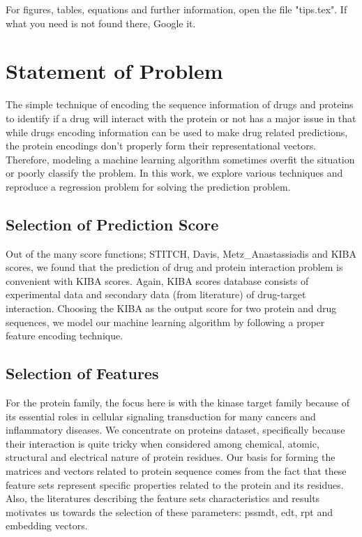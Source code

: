 For figures, tables, equations and further information, open the file "tips.tex". If what you need is not found there, Google it.

\fi

\section{Statement of Problem}
The simple technique of encoding the sequence information of drugs and proteins to identify if a drug will interact with the protein or not has a major issue in that while drugs encoding information can be used to make drug related predictions, the protein encodings don't properly form their representational vectors. Therefore, modeling a machine learning algorithm sometimes overfit the situation or poorly classify the problem. In this work, we explore various techniques and reproduce a regression problem for solving the prediction problem.

\subsection{Selection of Prediction Score}

Out of the many score functions; STITCH, Davis, Metz\_Anastassiadis and KIBA scores, we found that the prediction of drug and protein interaction problem is convenient with KIBA scores. Again, KIBA scores database consists of experimental data and secondary data (from literature) of drug-target interaction. Choosing the KIBA as the output score for two protein and drug sequences, we model our machine learning algorithm by following a proper feature encoding technique.

\subsection{Selection of Features}

For the protein family, the focus here is with the kinase target family because of its essential roles in cellular signaling transduction for many cancers and inflammatory diseases. We concentrate on proteins dataset, specifically because their interaction is quite tricky when considered among chemical, atomic, structural and electrical nature of protein residues. Our basis for forming the matrices and vectors related to protein sequence comes from the fact that these feature sets represent specific properties related to the protein and its residues. Also, the literatures describing the feature sets characteristics and results motivates us towards the selection of these parameters: \acrshort{pssmdt}, \acrshort{edt}, \acrshort{rpt} and embedding vectors.


